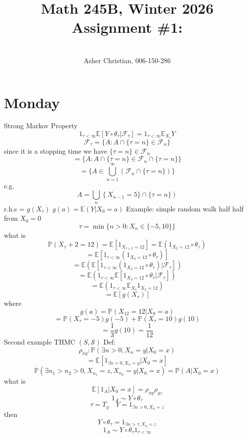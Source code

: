 \documentclass[11pt]{article}
\newcommand{\cnum}{Math 245B}
\newcommand{\ced}{Winter 2026}
\newcommand{\ctitle}[4]{\title{\vspace{-0.5in}\cnum, \ced\\Assignment #1: #2}\author{\vspace{-0.35in}\\#3, #4}}
\begin{document}
\ctitle{\#1}{}{Asher Christian}{006-150-286}
\date{}
\maketitle

\section{Monday}
Strong Markov Property
\[
    1_{\tau  <\infty}   \mathbb{E}[Y \circ \theta_\tau | \mathcal{F}_\tau] = 1_{\tau < \infty}\mathbb{E}_{X_\tau} Y
\] 
\[
    \mathcal{F}_\tau = \{A : A \cap \{\tau = n\} \in \mathcal{F}_n\}
\] 
since it is a stopping time we have $\{\tau = n\} \in \mathcal{F}_n$
\[
    = \{A : A \cap \{\tau = n\} \in \mathcal{F}_n \cap \{\tau = n\}\}
\] 
\[
    = \{A  \in \bigcup_{n=1}^{\infty} \left(\mathcal{F}_n \cap \{\tau = n\}\right)\}
\] 
e.g.
\[
A = \bigcup_{n} \left\{X_{n-1} = 5\} \cap \{\tau = n\}\right)
\] 
r.h.s = $g(X_\tau)$ 
$g(a) = \mathbb{E}(Y | X_0 = a)$
Example:
simple random walk half half from $X_0 = 0$
\[
    \tau = \min\{n  > 0 : X_n \in \{-5,10\}\}
\] 
what is
\[
    \mathbb{P}(X_\tau + 2 = 12) = \mathbb{E}[1_{X_{\tau + 2} = 12}] = \mathbb{E}(1_{X_2 = 12} \circ \theta_\tau)
\] 
\[
    = \mathbb{E}[ 1_{\tau < \infty} \left(1_{X_2 = 12} \circ \theta_\tau\right)]
\] 
\[
    = \mathbb{E}\left( \mathbb{E}[1_{\tau < \infty} ( 1_{X_2 = 12} \circ \theta_\tau) | \mathcal{F}_{\tau}] \right)
\] 
\[
    = \mathbb{E}\left( 1_{\tau < \infty} \mathbb{E}[1_{X_2 = 12} \circ \theta_\tau| \mathcal{F}_\tau]\right) 
\] 
\[
    = \mathbb{E}\left(1_{\tau < \infty} \mathbb{E}_{X_\tau} 1_{X_2 = 12}\right)
\] 
\[
    = \mathbb{E}[g(X_{\tau})]
\] 
where
\[
    g(a) = \mathbb{P}(X_{12} = 12 | X_0 = a)
\] 
\[
    = \mathbb{P}(X_{\tau} = -5) g(-5) + \mathbb{P}(X_{\tau} = 10) g(10)
\] 
\[
= \frac{1}{3} g(10) = \frac{1}{12}
\] 
Second example
THMC $(S, \mathcal{S})$
Def: 
 \[
     \rho_{xy} : \mathbb{P}(\exists n > 0 , X_n = y | X_0 = x)
\] 
\[
    = \mathbb{E}[1_{\exists n > 0, X_n  =y} | X_0 = x]
\] 
\[
    \mathbb{P}(\exists n_1 > n_2 > 0 , X_{n_1} = z, X_{n_2} = y | X_0 = x) = \mathbb{P}(A | X_0 = x)
\] 
what is 
\[
    \mathbb{E}[1_A | X_0 = x] = \rho_{xy} \rho_{yz}
\] 
\[
    1_A \sim Y \circ \theta_\tau
\] 
\[
    \tau = T_y \quad Y = 1_{\exists n > 0, X_n = z}
\] 
then
\[
    Y \circ \theta_\tau = 1_{\exists n > \tau , X_n = z}
\] 
\[
    1_A \sim Y \circ \theta_\tau 1_{\tau < \infty}
\] 
\end{document}
